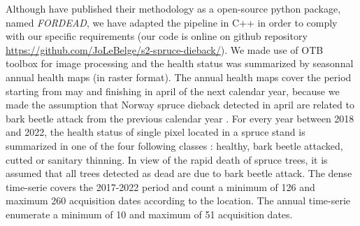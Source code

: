 \documentclass[3p,procedia]{elsarticle}
\begin{document}
Although \cite{dutrieux_package_2021} have published their methodology as a open-source python package, named \textit{FORDEAD}, we have adapted the pipeline in C++ in order to comply with our specific requirements (our code is online on github repository \url{https://github.com/JoLeBelge/s2-spruce-dieback/}). 
We made use of OTB toolbox \citep{grizonnet_2017_OTB} for image processing and the health status was summarized by seasonnal annual health maps (in raster format).
The annual health maps cover the period starting from may and finishing in april of the next calendar year, because we made the assumption that Norway spruce dieback detected in april are related to bark beetle attack from the previous calendar year \citep{muller_features_2022}.
For every year between 2018 and 2022, the health status of single pixel located in a spruce stand is summarized in one of the four following classes : healthy, bark beetle attacked, cutted or sanitary thinning.
In view of the rapid death of spruce trees, it is assumed that all trees detected as dead are due to bark beetle attack.
The dense time-serie covers the 2017-2022 period and count a minimum of 126 and maximum 260 acquisition dates according to the location. 
The annual time-serie enumerate a minimum of 10 and maximum of 51 acquisition dates. 
 
\end{document}
